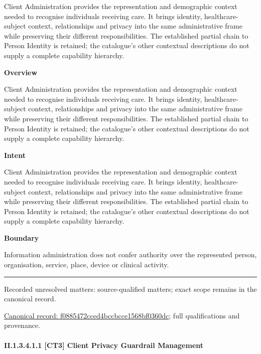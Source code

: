Client Administration provides the representation and demographic context needed to recognise individuals receiving care. It brings identity, healthcare-subject context, relationships and privacy into the same administrative frame while preserving their different responsibilities. The established partial chain to Person Identity is retained; the catalogue's other contextual descriptions do not supply a complete capability hierarchy.



\textbf{Overview}



Client Administration provides the representation and demographic context needed to recognise individuals receiving care. It brings identity, healthcare-subject context, relationships and privacy into the same administrative frame while preserving their different responsibilities. The established partial chain to Person Identity is retained; the catalogue's other contextual descriptions do not supply a complete capability hierarchy.



\textbf{Intent}



Client Administration provides the representation and demographic context needed to recognise individuals receiving care. It brings identity, healthcare-subject context, relationships and privacy into the same administrative frame while preserving their different responsibilities. The established partial chain to Person Identity is retained; the catalogue's other contextual descriptions do not supply a complete capability hierarchy.



\textbf{Boundary}



Information administration does not confer authority over the represented person, organisation, service, place, device or clinical activity.



\medskip\hrule\medskip

{\small Recorded unresolved matters: source-qualified matters; exact scope remains in the canonical record.}\par
{\footnotesize \href{../../../../../../../continuum/strategy/capability/f0885472cced4bccbcce1568bf0360dc.md}{Canonical record: f0885472cced4bccbcce1568bf0360dc}; full qualifications and provenance.}\par
\paragraph*{II.1.3.4.1.1 [CT3] Client Privacy Guardrail Management}
\label{navigation:II.1.3.4.1.1}

